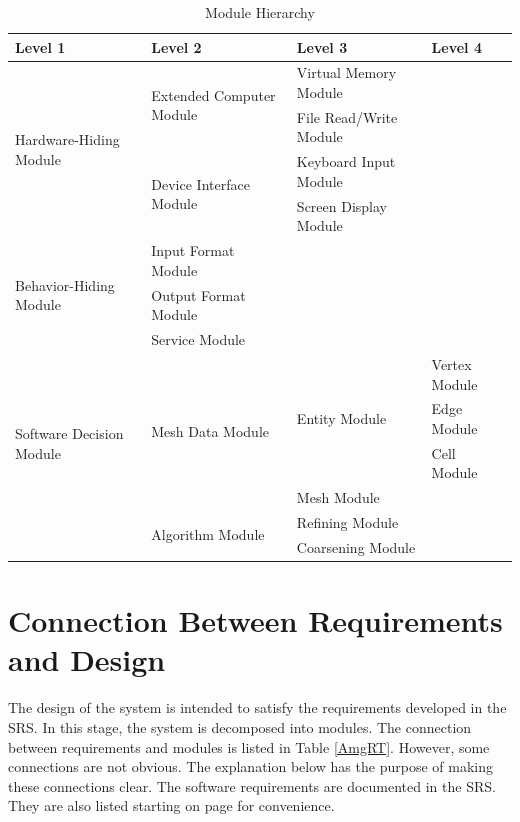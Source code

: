 \documentclass[12pt,titlepage]{article}
\begin{document}
\begin{table}[ht]
\centering
\begin{tabular}{p{}|p{}|p{}|p{}}
\hline
\textbf{Level 1} & \textbf{Level 2} & \textbf{Level 3} & \textbf{Level 4} \\ \hline

\multirow{4}{0.15\textwidth}{Hardware-Hiding Module} 
& \multirow{2}{0.25\textwidth}{Extended Computer Module} & Virtual Memory Module&  \\ \cline{3-3}
&  & File Read/Write Module & \\ \cline{2-3}
& \multirow{2}{0.25\textwidth}{Device Interface Module} & Keyboard Input Module & \\\cline{3-3}
& & Screen Display Module & \\\hline

\multirow{3}{0.15\textwidth}{Behavior-Hiding Module} & Input Format Module & &\\ \cline{2-2}
& Output Format Module & &\\ \cline{2-2}
& Service Module & &\\\hline

\multirow{5}{0.15\textwidth}{Software Decision Module}
& \multirow{4}{0.25\textwidth}{Mesh Data Module} &
\multirow{3}{0.25\textwidth}{Entity Module} & Vertex Module \\ \cline{4-4}
& & & Edge Module \\ \cline{4-4}
& & & Cell Module \\ \cline{3-4}
& & Mesh Module & \\ \cline{2-4}
& \multirow {2}{0.25\textwidth}{Algorithm Module} & Refining Module & \\ \cline{3-3}
& & Coarsening Module & \\ \hline   

\end{tabular}
\caption{Module Hierarchy}
\label{AmgMH}
\end{table}

\section{Connection Between Requirements and Design \label{AmgSecConnection}}
The design of the system is intended to satisfy the requirements developed in the SRS. In this stage, the system is decomposed into modules. The connection between requirements and modules is listed in Table \ref{AmgRT}. However, some connections are not obvious. The explanation below has the purpose of making these connections clear. The software requirements are documented in the SRS. They are also listed starting on page \pageref{pagereq} for convenience.
\end{document}
